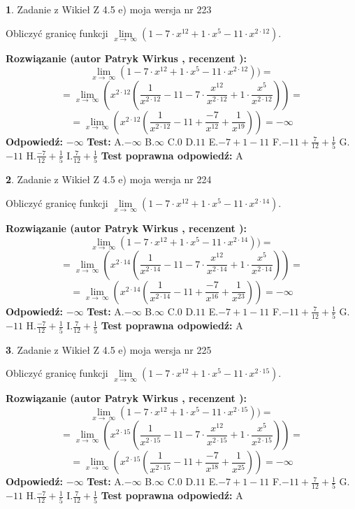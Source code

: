 \documentclass[12pt, a4paper]{article}
\theoremstyle{definition} %
\newtheorem{zad}{}
\newcommand{\zadStart}[1]{\begin{zad}#1\newline}
\newcommand{\zadStop}{\end{zad}}
\newcommand{\rozwStart}[2]{\noindent \textbf{Rozwiązanie (autor #1 , recenzent #2): }\newline}
\newcommand{\rozwStop}{\newline}
\newcommand{\odpStart}{\noindent \textbf{Odpowiedź:}\newline}
\newcommand{\odpStop}{\newline}
\newcommand{\testStart}{\noindent \textbf{Test:}\newline}
\newcommand{\testStop}{\newline}
\newcommand{\kluczStart}{\noindent \textbf{Test poprawna odpowiedź:}\newline}
\newcommand{\kluczStop}{\newline}
\begin{document}
\zadStart{Zadanie z Wikieł Z 4.5 e) moja wersja nr 223}



Obliczyć granicę funkcji  $\lim\limits_{x\to\ \infty}(1 - 7 \cdot x^{12}+1 \cdot x^{5}- 11 \cdot x^{2\cdot12})$.
\zadStop
\rozwStart{Patryk Wirkus}{}
$$\lim\limits_{x\to\ \infty}(1 - 7 \cdot x^{12}+1 \cdot x^{5}- 11 \cdot x^{2\cdot12}))=$$
$$=\lim\limits_{x\to\ \infty}(x^{2\cdot12}(\frac{1}{x^{2\cdot12}}-11 -7 \cdot \frac{x^{12}}{x^{2\cdot12}}+1 \cdot \frac{x^{5}}{x^{2\cdot12}}))=$$
$$=\lim\limits_{x\to\ \infty}(x^{2\cdot12}(\frac{1}{x^{2\cdot12}}-11 + \frac{-7}{x^{12}}+ \frac{1}{x^{19}}))=-\infty$$
\rozwStop
\odpStart
$-\infty$
\odpStop
\testStart
A.$-\infty$ B.$\infty$ C.$0$ D.$11$ E.$-7 + 1 - 11$
F.$-11+\frac{7}{12}+\frac{1}{5}$ G.$-11$
H.$\frac{-7}{12}+\frac{1}{5}$
I.$\frac{7}{12}+\frac{1}{5}$
\testStop
\kluczStart
A
\kluczStop



\zadStart{Zadanie z Wikieł Z 4.5 e) moja wersja nr 224}



Obliczyć granicę funkcji  $\lim\limits_{x\to\ \infty}(1 - 7 \cdot x^{12}+1 \cdot x^{5}- 11 \cdot x^{2\cdot14})$.
\zadStop
\rozwStart{Patryk Wirkus}{}
$$\lim\limits_{x\to\ \infty}(1 - 7 \cdot x^{12}+1 \cdot x^{5}- 11 \cdot x^{2\cdot14}))=$$
$$=\lim\limits_{x\to\ \infty}(x^{2\cdot14}(\frac{1}{x^{2\cdot14}}-11 -7 \cdot \frac{x^{12}}{x^{2\cdot14}}+1 \cdot \frac{x^{5}}{x^{2\cdot14}}))=$$
$$=\lim\limits_{x\to\ \infty}(x^{2\cdot14}(\frac{1}{x^{2\cdot14}}-11 + \frac{-7}{x^{16}}+ \frac{1}{x^{23}}))=-\infty$$
\rozwStop
\odpStart
$-\infty$
\odpStop
\testStart
A.$-\infty$ B.$\infty$ C.$0$ D.$11$ E.$-7 + 1 - 11$
F.$-11+\frac{7}{12}+\frac{1}{5}$ G.$-11$
H.$\frac{-7}{12}+\frac{1}{5}$
I.$\frac{7}{12}+\frac{1}{5}$
\testStop
\kluczStart
A
\kluczStop



\zadStart{Zadanie z Wikieł Z 4.5 e) moja wersja nr 225}



Obliczyć granicę funkcji  $\lim\limits_{x\to\ \infty}(1 - 7 \cdot x^{12}+1 \cdot x^{5}- 11 \cdot x^{2\cdot15})$.
\zadStop
\rozwStart{Patryk Wirkus}{}
$$\lim\limits_{x\to\ \infty}(1 - 7 \cdot x^{12}+1 \cdot x^{5}- 11 \cdot x^{2\cdot15}))=$$
$$=\lim\limits_{x\to\ \infty}(x^{2\cdot15}(\frac{1}{x^{2\cdot15}}-11 -7 \cdot \frac{x^{12}}{x^{2\cdot15}}+1 \cdot \frac{x^{5}}{x^{2\cdot15}}))=$$
$$=\lim\limits_{x\to\ \infty}(x^{2\cdot15}(\frac{1}{x^{2\cdot15}}-11 + \frac{-7}{x^{18}}+ \frac{1}{x^{25}}))=-\infty$$
\rozwStop
\odpStart
$-\infty$
\odpStop
\testStart
A.$-\infty$ B.$\infty$ C.$0$ D.$11$ E.$-7 + 1 - 11$
F.$-11+\frac{7}{12}+\frac{1}{5}$ G.$-11$
H.$\frac{-7}{12}+\frac{1}{5}$
I.$\frac{7}{12}+\frac{1}{5}$
\testStop
\kluczStart
A
\kluczStop
\end{document}
